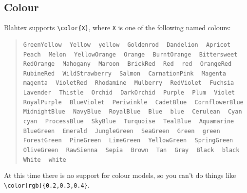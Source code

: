\documentclass{article}
\newcommand{\texcommand}[1]{\textbackslash{}#1}
\newcommand{\spacer}{\,\,\, \hfil}
\newcommand{\lastspacer}{\hfill\hfill\hfill}
\newenvironment{mylist}{\begin{quote}}{\end{quote}}
\begin{document}
\subsection{Colour}

Blahtex supports \texttt{\texcommand{color}\{X\}}, where \texttt{X} is one of the following named colours:

\begin{mylist}
\texttt{GreenYellow} \spacer
\texttt{Yellow} \spacer
\texttt{yellow} \spacer
\texttt{Goldenrod} \spacer
\texttt{Dandelion} \spacer
\texttt{Apricot} \spacer
\texttt{Peach} \spacer
\texttt{Melon} \spacer
\texttt{YellowOrange} \spacer
\texttt{Orange} \spacer
\texttt{BurntOrange} \spacer
\texttt{Bittersweet} \spacer
\texttt{RedOrange} \spacer
\texttt{Mahogany} \spacer
\texttt{Maroon} \spacer
\texttt{BrickRed} \spacer
\texttt{Red} \spacer
\texttt{red} \spacer
\texttt{OrangeRed} \spacer
\texttt{RubineRed} \spacer
\texttt{WildStrawberry} \spacer
\texttt{Salmon} \spacer
\texttt{CarnationPink} \spacer
\texttt{Magenta} \spacer
\texttt{magenta} \spacer
\texttt{VioletRed} \spacer
\texttt{Rhodamine} \spacer
\texttt{Mulberry} \spacer
\texttt{RedViolet} \spacer
\texttt{Fuchsia} \spacer
\texttt{Lavender} \spacer
\texttt{Thistle} \spacer
\texttt{Orchid} \spacer
\texttt{DarkOrchid} \spacer
\texttt{Purple} \spacer
\texttt{Plum} \spacer
\texttt{Violet} \spacer
\texttt{RoyalPurple} \spacer
\texttt{BlueViolet} \spacer
\texttt{Periwinkle} \spacer
\texttt{CadetBlue} \spacer
\texttt{CornflowerBlue} \spacer
\texttt{MidnightBlue} \spacer
\texttt{NavyBlue} \spacer
\texttt{RoyalBlue} \spacer
\texttt{Blue} \spacer
\texttt{blue} \spacer
\texttt{Cerulean} \spacer
\texttt{Cyan} \spacer
\texttt{cyan} \spacer
\texttt{ProcessBlue} \spacer
\texttt{SkyBlue} \spacer
\texttt{Turquoise} \spacer
\texttt{TealBlue} \spacer
\texttt{Aquamarine} \spacer
\texttt{BlueGreen} \spacer
\texttt{Emerald} \spacer
\texttt{JungleGreen} \spacer
\texttt{SeaGreen} \spacer
\texttt{Green} \spacer
\texttt{green} \spacer
\texttt{ForestGreen} \spacer
\texttt{PineGreen} \spacer
\texttt{LimeGreen} \spacer
\texttt{YellowGreen} \spacer
\texttt{SpringGreen} \spacer
\texttt{OliveGreen} \spacer
\texttt{RawSienna} \spacer
\texttt{Sepia} \spacer
\texttt{Brown} \spacer
\texttt{Tan} \spacer
\texttt{Gray} \spacer
\texttt{Black} \spacer
\texttt{black} \spacer
\texttt{White} \spacer
\texttt{white} \lastspacer
\end{mylist}

At this time there is no support for colour models, so you can't do things like \texttt{\texcommand{color}[rgb]\{0.2,0.3,0.4\}}.
\end{document}
